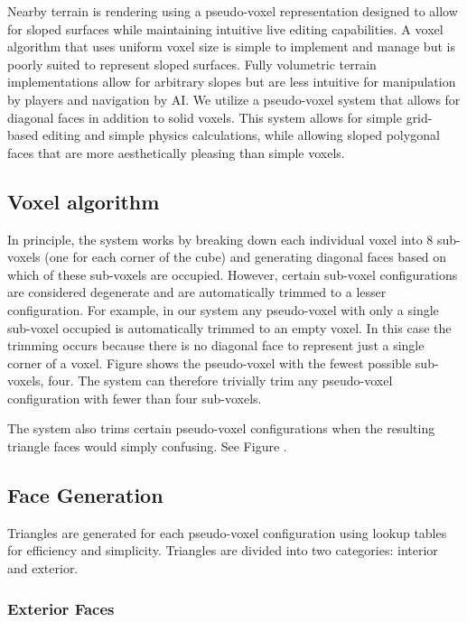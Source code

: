 Nearby terrain is rendering using a pseudo-voxel representation designed to allow for sloped surfaces while maintaining intuitive live editing capabilities.
A voxel algorithm that uses uniform voxel size is simple to implement and manage but is poorly suited to represent sloped surfaces.
Fully volumetric terrain implementations allow for arbitrary slopes but are less intuitive for manipulation by players and navigation by AI.
We utilize a pseudo-voxel system that allows for diagonal faces in addition to solid voxels.
This system allows for simple grid-based editing and simple physics calculations, while allowing sloped polygonal faces that are more aesthetically pleasing than simple voxels.

\subsection{Voxel algorithm}

In principle, the system works by breaking down each individual voxel into 8 sub-voxels (one for each corner of the cube) and generating diagonal faces based on which of these sub-voxels are occupied.
However, certain sub-voxel configurations are considered degenerate and are automatically trimmed to a lesser configuration.
For example, in our system any pseudo-voxel with only a single sub-voxel occupied is automatically trimmed to an empty voxel.
In this case the trimming occurs because there is no diagonal face to represent just a single corner of a voxel.
Figure  shows the pseudo-voxel with the fewest possible sub-voxels, four.
The system can therefore trivially trim any pseudo-voxel configuration with fewer than four sub-voxels.

The system also trims certain pseudo-voxel configurations when the resulting triangle faces would simply confusing.
See Figure .

\subsection{Face Generation}

Triangles are generated for each pseudo-voxel configuration using lookup tables for efficiency and simplicity.
Triangles are divided into two categories: interior and exterior.

\subsubsection{Exterior Faces}

